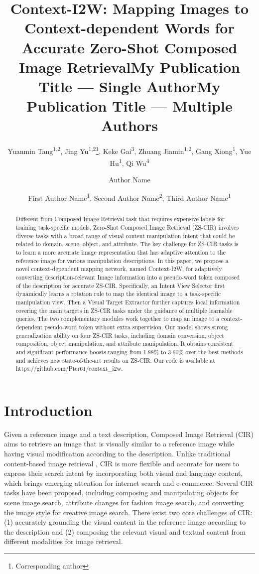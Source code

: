 \documentclass[letterpaper]{article} \usepackage{aaai24}  \usepackage{times}  \usepackage{helvet}  \usepackage{courier}  \usepackage[hyphens]{url}  \usepackage{graphicx} \urlstyle{rm} \def\UrlFont{\rm}  \usepackage{natbib}  \usepackage{caption} \frenchspacing  \setlength{\pdfpagewidth}{8.5in} \setlength{\pdfpageheight}{11in} \usepackage{algorithm}
\title{Context-I2W: Mapping Images to Context-dependent Words for Accurate Zero-Shot Composed Image Retrieval}
\author {
Yuanmin Tang\textsuperscript{\rm 1,\rm 2},
    Jing Yu\textsuperscript{\rm 1,\rm 2}\thanks{Corresponding author},
    Keke Gai\textsuperscript{\rm 3}, 
    Zhuang Jiamin\textsuperscript{\rm 1,\rm 2},
    Gang Xiong\textsuperscript{\rm 1},
    Yue Hu\textsuperscript{\rm 1}, 
    Qi Wu\textsuperscript{\rm 4}
}
\title{My Publication Title --- Single Author}
\author {
    Author Name
}
\title{My Publication Title --- Multiple Authors}
\author {
First Author Name\textsuperscript{\rm 1},
    Second Author Name\textsuperscript{\rm 2},
    Third Author Name\textsuperscript{\rm 1}
}
\begin{document}
\maketitle

\begin{abstract}

Different from Composed Image Retrieval task that requires expensive labels for training task-specific models, Zero-Shot Composed Image Retrieval (ZS-CIR) involves diverse tasks with a broad range of visual content manipulation intent that could be related to domain, scene, object, and attribute. The key challenge for ZS-CIR tasks is to learn a more accurate image representation that has adaptive attention to the reference image for various manipulation descriptions. In this paper, we propose a novel context-dependent mapping network, named Context-I2W,  for adaptively converting description-relevant Image information into a pseudo-word token composed of the description for accurate ZS-CIR. Specifically, an Intent View Selector first dynamically learns a rotation rule to map the identical image to a task-specific manipulation view. Then a Visual Target Extractor further captures local information covering the main targets in ZS-CIR tasks under the guidance of multiple learnable queries. The two complementary modules work together to map an image to a context-dependent pseudo-word token without extra supervision. Our model shows strong generalization ability on four ZS-CIR tasks, including domain conversion, object composition, object manipulation, and attribute manipulation. It obtains consistent and significant performance boosts ranging from 1.88\% to 3.60\% over the best methods and achieves new state-of-the-art results on ZS-CIR. Our code is available at https://github.com/Pter61/context\_i2w. 

 
\end{abstract}

\section{Introduction}

Given a reference image and a text description, Composed Image Retrieval (CIR) \cite{vo2019composing} aims to retrieve an image that is visually similar to a reference image while having visual modification according to the description. Unlike traditional content-based image retrieval \cite{datta2008image}, CIR is more flexible and accurate for users to express their search intent by incorporating both visual and language content, which brings emerging attention for internet search and e-commerce. Several CIR tasks have been proposed, including composing and manipulating objects for scene image search, attribute changes for
fashion image search, and converting the image style for creative image search. There exist two core challenges of CIR: (1) accurately grounding the visual content in the reference image according to the description and (2)  composing the relevant visual and textual content from different modalities for image retrieval. 
\end{document}
